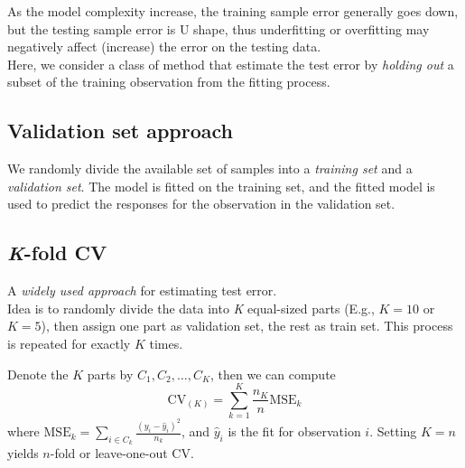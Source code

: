\documentclass{article}
\begin{document}
As the model complexity increase, the training sample error generally goes down, but the testing sample error is U shape, thus underfitting or overfitting may negatively affect (increase) the error on the testing data.\\

Here, we consider a class of method that estimate the test error by \textit{holding out} a subset of the training observation from the fitting process.

\subsection{Validation set approach}

We randomly divide the available set of samples into a \textit{training set} and a \textit{validation set}. The model is fitted on the training set, and the fitted model is used to predict the responses for the observation in the validation set.

\subsection{\textit{K}-fold CV}

A \textit{widely used approach} for estimating test error.\\

Idea is to randomly divide the data into \textit{K} equal-sized parts (E.g., $K = 10$ or $K = 5$), then assign one part as validation set, the rest as train set. This process is repeated for exactly $K$ times.

Denote the $K$ parts by $C_1, C_2, \dots, C_K$, then we can compute $$\mathrm{CV}_{(K)} = \sum_{k=1}^K \frac{n_K}{n}\mathrm{MSE}_k$$ where $\displaystyle \mathrm{MSE}_k = \sum_{i\in C_k}\frac{(y_i - \hat{y}_i)^2}{n_k}$, and $\hat{y}_i$ is the fit for observation $i$. Setting $K = n$ yields $n$-fold or leave-one-out CV.
\end{document}
